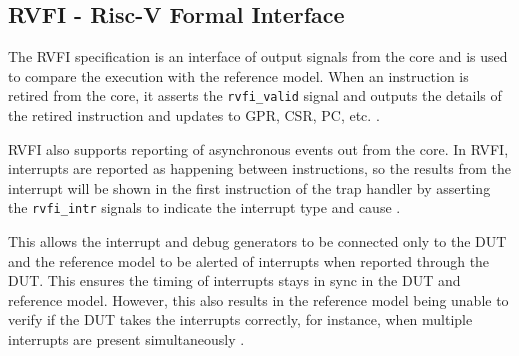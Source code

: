 \subsection{RVFI - Risc-V Formal Interface}
\label{sec:rvfi}

The RVFI specification is an interface of output signals from the core and is used to compare the execution with the reference model. 
When an instruction is retired from the core, it asserts the \lstinline{rvfi_valid} signal and outputs the details of the retired instruction and updates to GPR, CSR, PC, etc. \cite{symbioticedaRiscvformalDocsRvfi2020}.

RVFI also supports reporting of asynchronous events out from the core. In RVFI, interrupts are reported as happening between instructions, so the results from the interrupt will be shown in the first instruction of the trap handler by asserting the \lstinline{rvfi_intr} signals to indicate the interrupt type and cause \cite{openhwgroupRISCVFormalInterface2023}.

This allows the interrupt and debug generators to be connected only to the DUT and the reference model to be alerted of interrupts when reported through the DUT.
This ensures the timing of interrupts stays in sync in the DUT and reference model. However, this also results in the reference model being unable to verify if the DUT takes the interrupts correctly, for instance, when multiple interrupts are present simultaneously \cite{taylorAdvancedRISCVVerification2023}.

%
%    



